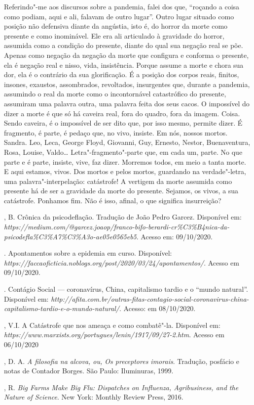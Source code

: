 Referindo"-me aos discursos sobre a pandemia, falei dos que, ``roçando a
coisa como podiam, aqui e ali, falavam de outro lugar''. Outro lugar
situado como posição não defensiva diante da angústia, isto é, do horror
da morte como presente e como inominável. Ele era ali articulado à
gravidade do horror, assumida como a condição do presente, diante do
qual sua negação real se põe. Apenas como negação da negação da morte
que configura e conforma o presente, ela é negação real e nisso, vida,
insistência. Porque assume a morte e chora sua dor, ela é o contrário da
sua glorificação. É a posição dos corpos reais, finitos, insones,
exaustos, assombrados, revoltados, insurgentes que, durante a pandemia,
assumindo o real da morte como o incontornável catastrófico do presente,
assumiram uma palavra outra, uma palavra feita dos seus cacos. O
impossível do dizer a morte é que só há caveira real, fora do quadro,
fora da imagem. Coisa. Sendo caveira, é o impossível de ser dito que,
por isso mesmo, permite dizer. É fragmento, é parte, é pedaço que, no
vivo, insiste. Em nós, nossos mortos. Sandra. Leo, Leca, George Floyd,
Giovanni, Guy, Ernesto, Nestor, Buenaventura, Rosa, Louise,
Valdo\ldots{} Letra"-fragmento"-parte que, em cada um, parte. No que parte
e é parte, insiste, vive, faz dizer. Morremos todos, em meio a tanta
morte. E aqui estamos, vivos. Dos mortos e pelos mortos, guardando na
verdade"-letra, uma palavra"-interpelação: catástrofe! A vertigem da morte
assumida como presente há de ser a gravidade da morte do presente.
Sejamos, os vivos, a sua catástrofe. Ponhamos fim. Não é isso, afinal, o
que significa insurreição?

\begin{bibliohedra}
, B. Crônica da psicodeflação. Tradução de João Pedro Garcez.
Disponível em:
\emph{https://medium.com/@garcez.joaop/franco-bifo-berardi-cr\%C3\%B4nica-da-psicodefla\%C3\%A7\%C3\%A3o-ae05e0565eb5}.
Acesso em: 09/10/2020.

. Apontamentos sobre a epidemia em curso.
Disponível:
\emph{https://faccaoficticia.noblogs.org/post/2020/03/24/apontamentos/}.
Acesso em 09/10/2020.

. Contágio Social --- coronavírus, China, capitalismo
tardio e o ``mundo natural''. Disponível em:
\emph{http://afita.com.br/outras-fitas-contagio-social-coronavirus-china-capitalismo-tardio-e-o-mundo-natural/}.
Acesso: em 08/10/2020.

, V.I. A Catástrofe que nos ameaça e como combatê"-la. Disponível
em: \emph{https://www.marxists.org/portugues/lenin/1917/09/27-2.htm}.
Acesso em 06/10/2020

, D. A. \emph{A filosofia na alcova, ou, Os preceptores imorais}.
Tradução, posfácio e notas de Contador Borges. São Paulo: Iluminuras,
1999.

, R. \emph{Big Farms Make Big Flu: Dispatches on Influenza,
Agribusiness, and the Nature of Science}. New York: Monthly Review
Press, 2016.
\end{bibliohedra}

